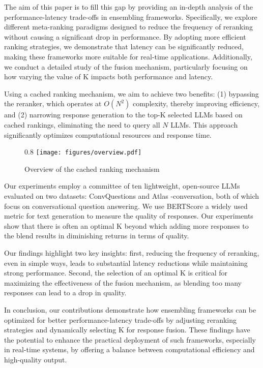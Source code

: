 \documentclass[sigconf,authordraft]{acmart}
\begin{document}
The aim of this paper is to fill this gap by providing an in-depth analysis of the performance-latency trade-offs in ensembling frameworks. Specifically, we explore different meta-ranking paradigms designed to reduce the frequency of reranking without causing a significant drop in performance. By adopting more efficient ranking strategies, we demonstrate that latency can be significantly reduced, making these frameworks more suitable for real-time applications. Additionally, we conduct a detailed study of the fusion mechanism, particularly focusing on how varying the value of K impacts both performance and latency. 



Using a cached ranking mechanism, we aim to achieve two benefits: (1) bypassing the reranker, which operates at \(O(N^2)\) complexity, thereby improving efficiency, and (2) narrowing response generation to the top-K selected LLMs based on cached rankings, eliminating the need to query all \(N\) LLMs. This approach significantly optimizes computational resources and response time.

\begin{figure}{0.8\linewidth}
    \centering
    \texttt{[image: figures/overview.pdf]}
    \caption{Overview of the cached ranking mechanism}
    \label{fig:scale}
\end{figure}

Our experiments employ a committee of ten lightweight, open-source LLMs evaluated on two datasets: ConvQuestions and Atlas -conversation, both of which focus on conversational question answering. We use BERTScore \cite{zhang2020bertscoreevaluatingtextgeneration} a widely used metric for text generation  to measure the quality of responses. Our experiments show that there is often an optimal K beyond which adding more responses to the blend results in diminishing returns in terms of quality.

Our findings highlight two key insights: first, reducing the frequency of reranking, even in simple ways, leads to substantial latency reductions while maintaining strong performance. Second, the selection of an optimal K is critical for maximizing the effectiveness of the fusion mechanism, as blending too many responses can lead to a drop in quality.

In conclusion, our contributions demonstrate how ensembling frameworks can be optimized for better performance-latency trade-offs by adjusting reranking strategies and dynamically selecting K for response fusion. These findings have the potential to enhance the practical deployment of such frameworks, especially in real-time systems, by offering a balance between computational efficiency and high-quality output.
\end{document}
